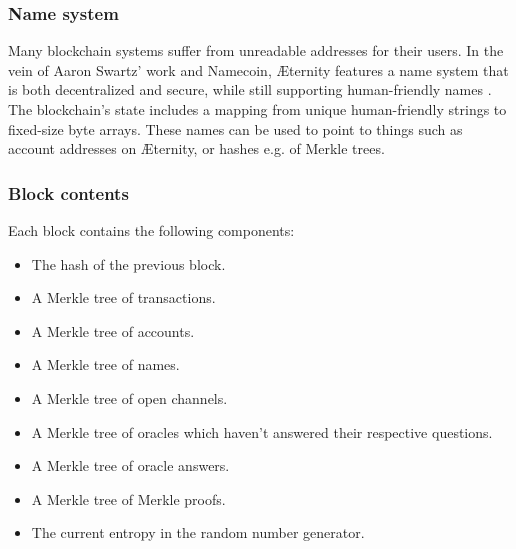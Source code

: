 \documentclass[a4paper, 10pt, conference]{ieeeconf}      %
\begin{document}
\begin{draft}
\subsubsection{Name system}
Many blockchain systems suffer from unreadable addresses for their users. In the vein of Aaron Swartz' work and Namecoin, Æternity features a name system that is both decentralized and secure, while still supporting human-friendly names \cite{aaron}. The blockchain's state includes a mapping from unique human-friendly strings to %
fixed-size byte arrays. These names can be used to point to things such as account addresses on Æternity, or hashes e.g. of Merkle trees.


\subsubsection{Block contents}
\label{sec:blocks}
Each block contains the following components:

\begin{itemize} 
   \item The hash of the previous block. \label{block:prevhash}
   \item A Merkle tree of transactions. \label{block:txtree}
   \item A Merkle tree of accounts. \label{block:accounttree}
   \item A Merkle tree of names. \label{block:nametree}
   \item A Merkle tree of open channels. \label{block:chaneltree}
   \item A Merkle tree of oracles which haven't answered their respective questions. \label{block:questiontree}
   \item A Merkle tree of oracle answers. \label{block:answertree}
   \item A Merkle tree of Merkle proofs. \label{block:prooftree}
   \item The current entropy in the random number generator. \label{block:entropy}
\end{itemize}


\end{draft}
\end{document}
